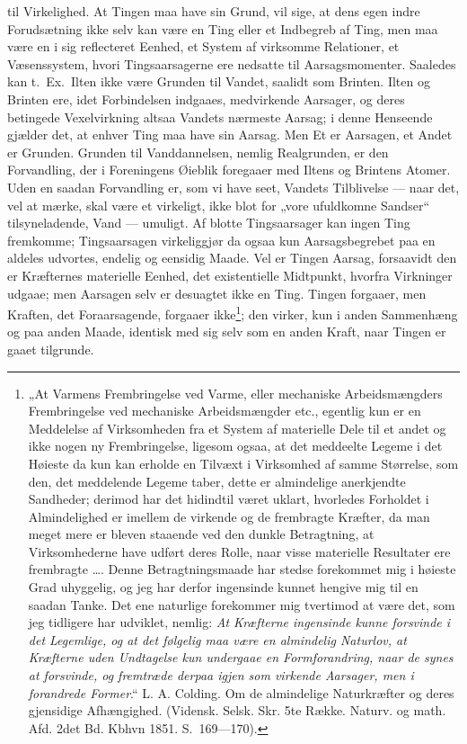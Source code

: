 \documentclass[12pt,a4paper]{book}
\begin{document}
til Virkelighed. At Tingen maa have sin Grund, vil sige,
at dens egen indre Forudsætning ikke selv kan være en
Ting eller et Indbegreb af Ting, men maa være en i sig
reflecteret Eenhed, et System af virksomme Relationer, et
Væsenssystem, hvori Tingsaarsagerne ere nedsatte til
Aarsagsmomenter. Saaledes kan t.~Ex.\ Ilten ikke være Grunden
til Vandet, saalidt som Brinten. Ilten og Brinten ere, idet
Forbindelsen indgaaes, medvirkende Aarsager, og deres
betingede Vexelvirkning altsaa Vandets nærmeste Aarsag; i
denne Henseende gjælder det, at enhver Ting maa have sin
Aarsag. Men Et er Aarsagen, et Andet er Grunden.
Grunden til Vanddannelsen, nemlig Realgrunden, er den
Forvandling, der i Foreningens Øieblik foregaaer med Iltens
og Brintens Atomer. Uden en saadan Forvandling er, som
vi have seet, Vandets Tilblivelse --- naar det, vel at mærke,
skal være et virkeligt, ikke blot for „vore ufuldkomne Sandser“
\setcounter{footnote}{0}
tilsyneladende, Vand --- umuligt. Af blotte Tingsaarsager kan
ingen Ting fremkomme; Tingsaarsagen virkeliggjør da ogsaa
kun Aarsagsbegrebet paa en aldeles udvortes, endelig og
eensidig Maade. Vel er Tingen Aarsag, forsaavidt den er
Kræfternes materielle Eenhed, det existentielle Midtpunkt,
hvorfra Virkninger udgaae; men Aarsagen selv er desuagtet
ikke en Ting. Tingen forgaaer, men Kraften, det
Foraarsagende, forgaaer ikke\footnote{„At Varmens Frembringelse ved
Varme, eller mechaniske Arbeidsmængders Frembringelse ved
mechaniske Arbeidsmængder etc., egentlig kun er en Meddelelse
af Virksomheden fra et System af materielle Dele til et andet
og ikke nogen ny Frembringelse, ligesom ogsaa, at det meddeelte
Legeme i det Høieste da kun kan erholde en Tilvæxt i
Virksomhed af samme Størrelse, som den, det meddelende Legeme
taber, dette er almindelige anerkjendte Sandheder; derimod har
det hidindtil været uklart, hvorledes Forholdet i Almindelighed
er imellem de virkende og de frembragte Kræfter, da man meget
mere er bleven staaende ved den dunkle Betragtning, at
Virksomhederne have udført deres Rolle, naar visse materielle
Resultater ere frembragte \ldots. Denne Betragtningsmaade har
stedse forekommet mig i høieste Grad uhyggelig, og jeg har
derfor ingensinde kunnet hengive mig til en saadan Tanke. Det
ene naturlige forekommer mig tvertimod at være det, som jeg
tidligere har udviklet, nemlig: \emph{At Kræfterne ingensinde
kunne forsvinde i det Legemlige, og at det følgelig maa være en
almindelig Naturlov, at Kræfterne uden Undtagelse kun
undergaae en Formforandring, naar de synes at forsvinde, og
fremtræde derpaa igjen som virkende Aarsager, men i forandrede
Former}.“ L. A. Colding. Om de almindelige Naturkræfter og
deres gjensidige Afhængighed. (Vidensk. Selsk. Skr. 5te Række.
Naturv. og math. Afd. 2det Bd. Kbhvn 1851. S.~169---170).};
den virker, kun i anden Sammenhæng og paa anden Maade,
identisk med sig selv som en anden Kraft, naar Tingen er
gaaet tilgrunde.
\end{document}
